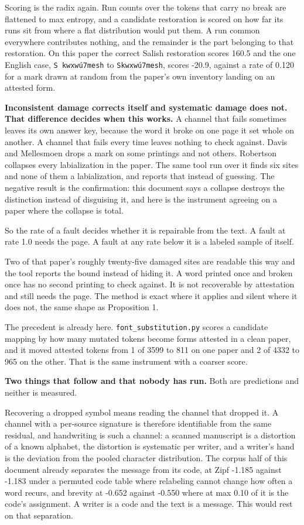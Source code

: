 Scoring is the radix again. Run counts over the tokens that carry no break are flattened to max entropy, and a candidate restoration is scored on how far its runs sit from where a flat distribution would put them. A run common everywhere contributes nothing, and the remainder is the part belonging to that restoration. On this paper the correct Salish restoration scores 160.5 and the one English case, \texttt{S kwxwú7mesh} to \texttt{Skwxwú7mesh}, scores -20.9, against a rate of 0.120 for a mark drawn at random from the paper's own inventory landing on an attested form.

\textbf{Inconsistent damage corrects itself and systematic damage does not. That difference decides when this works.} A channel that fails sometimes leaves its own answer key, because the word it broke on one page it set whole on another. A channel that fails every time leaves nothing to check against. Davis and Mellesmoen drops a mark on some printings and not others. Robertson collapses every labialization in the paper. The same tool run over it finds six sites and none of them a labialization, and reports that instead of guessing. The negative result is the confirmation: this document says a collapse destroys the distinction instead of disguising it, and here is the instrument agreeing on a paper where the collapse is total.

So the rate of a fault decides whether it is repairable from the text. A fault at rate 1.0 needs the page. A fault at any rate below it is a labeled sample of itself.

Two of that paper's roughly twenty-five damaged sites are readable this way and the tool reports the bound instead of hiding it. A word printed once and broken once has no second printing to check against. It is not recoverable by attestation and still needs the page. The method is exact where it applies and silent where it does not, the same shape as Proposition 1.

The precedent is already here. \texttt{font\_\allowbreak{}substitution.\allowbreak{}py} scores a candidate mapping by how many mutated tokens become forms attested in a clean paper, and it moved attested tokens from 1 of 3599 to 811 on one paper and 2 of 4332 to 965 on the other. That is the same instrument with a coarser score.

\textbf{Two things that follow and that nobody has run.} Both are predictions and neither is measured.

Recovering a dropped symbol means reading the channel that dropped it. A channel with a per-source signature is therefore identifiable from the same residual, and handwriting is such a channel: a scanned manuscript is a distortion of a known alphabet, the distortion is systematic per writer, and a writer's hand is the deviation from the pooled character distribution. The corpus half of this document already separates the message from its code, at Zipf -1.185 against -1.183 under a permuted code table where relabeling cannot change how often a word recurs, and brevity at -0.652 against -0.550 where at max 0.10 of it is the code's assignment. A writer is a code and the text is a message. This would rest on that separation.

